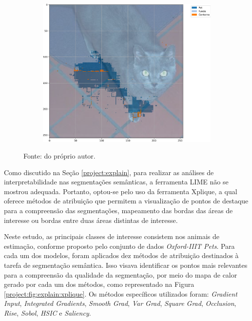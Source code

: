 \begin{figure}[H]
\begin{subfigure}[t]{0.32\textwidth}
         \label{results:fig:semantic:14.2}
     \end{subfigure}%
     ~ 
    \begin{subfigure}[t]{0.32\textwidth}
         \centering
         \includegraphics[width=1\linewidth]{recursos/imagens/results/bpca_miou_unetlie500_image_2_overlayed_segmentation.png}
         \label{results:fig:semantic:14.3}
     \end{subfigure}%

    Fonte: do próprio autor.
\end{figure}

Como discutido na Seção \ref{project:explain}, para realizar as análises de interpretabilidade nas segmentações semânticas, a ferramenta LIME não se mostrou adequada. Portanto, optou-se pelo uso da ferramenta Xplique, a qual oferece métodos de atribuição que permitem a visualização de pontos de destaque para a compreensão das segmentações, mapeamento das bordas das áreas de interesse ou bordas entre duas áreas distintas de interesse.

Neste estudo, as principais classes de interesse consistem nos animais de estimação, conforme proposto pelo conjunto de dados \textit{Oxford-IIIT Pets}. Para cada um dos modelos, foram aplicados dez métodos de atribuição destinados à tarefa de segmentação semântica. Isso visava identificar os pontos mais relevantes para a compreensão da qualidade da segmentação, por meio do mapa de calor gerado por cada um dos métodos, como representado na Figura \ref{project:fig:explain:xplique}. Os métodos específicos utilizados foram: \textit{Gradient Input}, \textit{Integrated Gradients}, \textit{Smooth Grad}, \textit{Var Grad}, \textit{Square Grad}, \textit{Occlusion}, \textit{Rise}, \textit{Sobol}, \textit{HSIC} e \textit{Saliency}.

